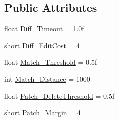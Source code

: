 \subsection*{Public Attributes}
\begin{DoxyCompactItemize}
\item 
float \hyperlink{class_diff_match_patch_1_1diff__match__patch_afcca976b068c3aa46709aba9792ad8af}{Diff\+\_\+\+Timeout} = 1.\+0f
\item 
short \hyperlink{class_diff_match_patch_1_1diff__match__patch_a86b7d969b457802022edffcececdbfa4}{Diff\+\_\+\+Edit\+Cost} = 4
\item 
float \hyperlink{class_diff_match_patch_1_1diff__match__patch_aae494f263fa95365e8aa32aa8c2533b4}{Match\+\_\+\+Threshold} = 0.\+5f
\item 
int \hyperlink{class_diff_match_patch_1_1diff__match__patch_a88b5300a87bcb2bde576ec8995654269}{Match\+\_\+\+Distance} = 1000
\item 
float \hyperlink{class_diff_match_patch_1_1diff__match__patch_a0594f0d0ff58f846840f79ce6403de9b}{Patch\+\_\+\+Delete\+Threshold} = 0.\+5f
\item 
short \hyperlink{class_diff_match_patch_1_1diff__match__patch_ac534df6ede582eae0b48c8d4683b1906}{Patch\+\_\+\+Margin} = 4
\end{DoxyCompactItemize}
